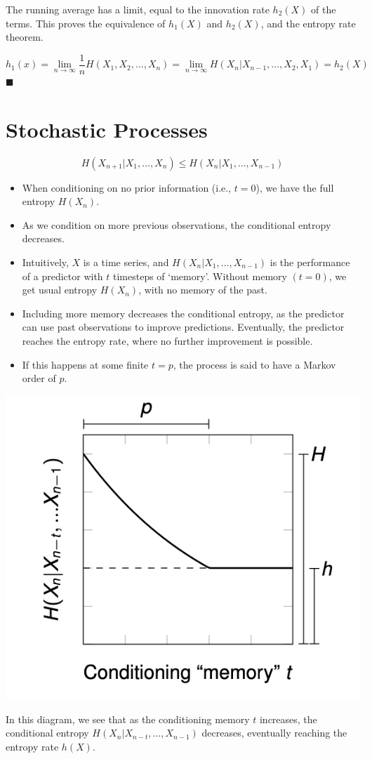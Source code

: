 {    The running average has a limit, equal to the innovation rate $h_2(X)$ of the terms. This proves the equivalence of $h_1(X)$ and $h_2(X)$, and the entropy rate theorem.

    \[
        h_1(x) = \lim_{n \to \infty} \frac{1}{n}H(X_1, X_2, \dots, X_n) = \lim_{n \to \infty} H(X_n| X_{n-1}, \dots, X_2, X_1) = h_2(X)
    \] \hfill \(\blacksquare\)

}
\newpage
\section{Stochastic Processes}
\[
    H(X_{n+1} | X_1, \dots, X_n) \leq H(X_n | X_1, \dots, X_{n-1})
\]
\begin{itemize}
    \item When conditioning on no prior information (i.e., \( t = 0 \)), we have the full entropy \( H(X_n) \).
    \item As we condition on more previous observations, the conditional entropy decreases.
    \item Intuitively, $X$ is a time series, and $H(X_n | X_1, \dots, X_{n-1})$ is the performance of a predictor with $t$ timesteps of `memory'. Without memory $(t=0)$, we get usual entropy $H(X_n)$, with no memory of the past.
    \item Including more memory decreases the conditional entropy, as the predictor can use past observations to improve predictions. Eventually, the predictor reaches the entropy rate, where no further improvement is possible.
    \item If this happens at some finite $t = p$, the process is said to have a Markov order of $p$.
\end{itemize}

\begin{marginfigure}
    \includegraphics[width=\linewidth]{img/conditioning.png}
    \caption{In this diagram, we see that as the conditioning memory \( t \) increases, the conditional entropy \( H(X_n | X_{n-t}, \dots, X_{n-1}) \) decreases, eventually reaching the entropy rate \( h(X) \).}
\end{marginfigure}

